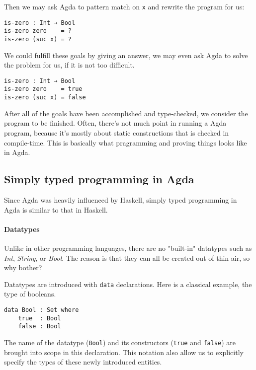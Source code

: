 \documentclass[12pt, a4paper]{article}
\begin{document}
Then we may ask Agda to pattern match on {\lstinline|x|} and rewrite the program for us:

\begin{lstlisting}
is-zero : Int → Bool
is-zero zero    = ?
is-zero (suc x) = ?
\end{lstlisting}

We could fulfill these goals by giving an answer, we may even ask Agda to solve
the problem for us, if it is not too difficult.

\begin{lstlisting}
is-zero : Int → Bool
is-zero zero    = true
is-zero (suc x) = false
\end{lstlisting}

After all of the goals have been accomplished and type-checked, we consider the
program to be finished. Often, there's not much point in running a Agda program,
because it's mostly about static constructions that is checked in compile-time.
This is basically what pragramming and proving things looks like in Agda.

\subsection{Simply typed programming in Agda}

Since Agda was heavily influenced by Haskell, simply typed programming in Agda
is similar to that in Haskell.

\paragraph{Datatypes}

Unlike in other programming languages, there are no "built-in"
datatypes such as \textit{Int}, \textit{String}, or \textit{Bool}.
The reason is that they can all be created out of thin air, so why bother?

Datatypes are introduced with {\lstinline|data|} declarations.
Here is a classical example, the type of booleans.

\begin{lstlisting}
data Bool : Set where
    true  : Bool
    false : Bool
\end{lstlisting}

The name of the datatype ({\lstinline|Bool|}) and its constructors
({\lstinline|true|} and {\lstinline|false|}) are brought into scope in this declaration.
This notation also allow us to explicitly specify the types of these newly introduced entities.
\end{document}
